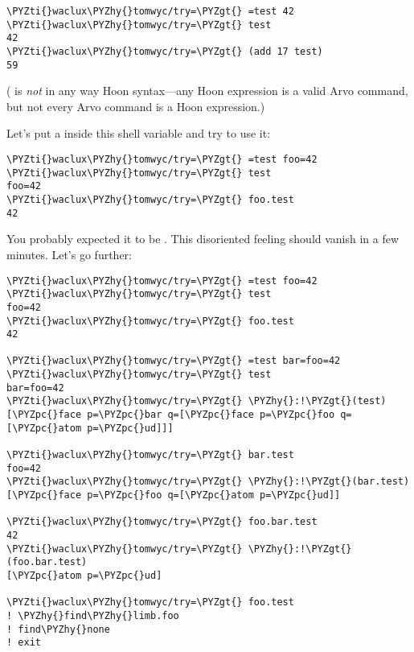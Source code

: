 \begin{framed_shaded}
\begin{Verbatim}[fontsize=\relsize{-2.5},fontseries=b,commandchars=\\\{\}]
\PYZti{}waclux\PYZhy{}tomwyc/try=\PYZgt{} =test 42
\PYZti{}waclux\PYZhy{}tomwyc/try=\PYZgt{} test
42
\PYZti{}waclux\PYZhy{}tomwyc/try=\PYZgt{} (add 17 test)
59
\end{Verbatim}
\end{framed_shaded}

( is \emph{not} in any way Hoon syntax---any
Hoon expression is a valid Arvo command, but not every Arvo
command is a Hoon expression.)

Let's put a  inside this shell variable and try to use it:

\begin{framed_shaded}
\begin{Verbatim}[fontsize=\relsize{-2.5},fontseries=b,commandchars=\\\{\}]
\PYZti{}waclux\PYZhy{}tomwyc/try=\PYZgt{} =test foo=42
\PYZti{}waclux\PYZhy{}tomwyc/try=\PYZgt{} test
foo=42
\PYZti{}waclux\PYZhy{}tomwyc/try=\PYZgt{} foo.test
42
\end{Verbatim}
\end{framed_shaded}

You probably expected it to be .  This disoriented
feeling should vanish in a few minutes.  Let's go further:

\begin{framed_shaded}
\begin{Verbatim}[fontsize=\relsize{-2.5},fontseries=b,commandchars=\\\{\}]
\PYZti{}waclux\PYZhy{}tomwyc/try=\PYZgt{} =test foo=42
\PYZti{}waclux\PYZhy{}tomwyc/try=\PYZgt{} test
foo=42
\PYZti{}waclux\PYZhy{}tomwyc/try=\PYZgt{} foo.test
42

\PYZti{}waclux\PYZhy{}tomwyc/try=\PYZgt{} =test bar=foo=42
\PYZti{}waclux\PYZhy{}tomwyc/try=\PYZgt{} test
bar=foo=42
\PYZti{}waclux\PYZhy{}tomwyc/try=\PYZgt{} \PYZhy{}:!\PYZgt{}(test)
[\PYZpc{}face p=\PYZpc{}bar q=[\PYZpc{}face p=\PYZpc{}foo q=[\PYZpc{}atom p=\PYZpc{}ud]]]

\PYZti{}waclux\PYZhy{}tomwyc/try=\PYZgt{} bar.test
foo=42
\PYZti{}waclux\PYZhy{}tomwyc/try=\PYZgt{} \PYZhy{}:!\PYZgt{}(bar.test)
[\PYZpc{}face p=\PYZpc{}foo q=[\PYZpc{}atom p=\PYZpc{}ud]]

\PYZti{}waclux\PYZhy{}tomwyc/try=\PYZgt{} foo.bar.test
42
\PYZti{}waclux\PYZhy{}tomwyc/try=\PYZgt{} \PYZhy{}:!\PYZgt{}(foo.bar.test)
[\PYZpc{}atom p=\PYZpc{}ud]

\PYZti{}waclux\PYZhy{}tomwyc/try=\PYZgt{} foo.test
! \PYZhy{}find\PYZhy{}limb.foo
! find\PYZhy{}none
! exit
\end{Verbatim}
\end{framed_shaded}

